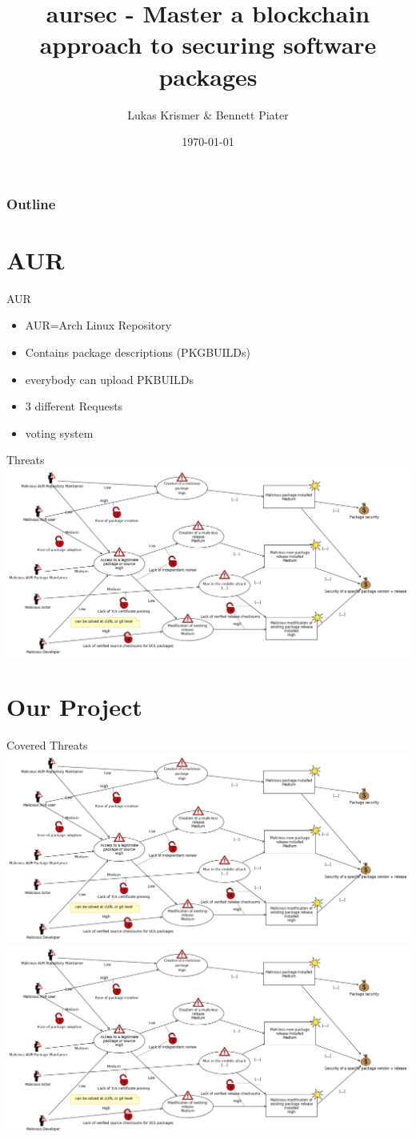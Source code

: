 \documentclass{beamer}
\title{aursec - Master a blockchain approach to securing software packages}
\author{Lukas Krismer \& Bennett Piater}
\institute{Universität Innsbruck - QE - Christian Sillaber}
\date{\today}
\begin{document}
\maketitle

\begin{frame}
	\frametitle{Outline}
	\tableofcontents
\end{frame}

\section{AUR}

\begin{frame}{AUR}
\begin{itemize}
	\item AUR=Arch Linux Repository
	\item Contains package descriptions (PKGBUILDs)
	\item everybody can upload PKBUILDs
	\item 3 different Requests
	\item voting system
\end{itemize}
\end{frame}

\begin{frame}{Threats}
\includegraphics[width=\textwidth]{threat.png}
\note{}
\end{frame}

\section{Our Project}

\begin{frame}{Covered Threats}
\includegraphics<1>[width=\textwidth]{threat.png}
\includegraphics<2>[width=\textwidth]{threat.png} %
\end{frame}
\end{document}
